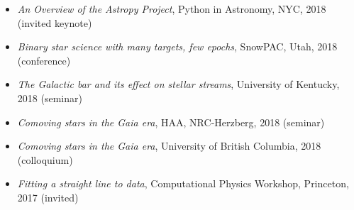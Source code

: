 \documentclass[12pt, letterpaper]{apw-cv}
\begin{document}
\begin{itemize}
    \item \emph{An Overview of the Astropy Project}, Python in Astronomy, NYC, 2018 (invited keynote)
    \item \emph{Binary star science with many targets, few epochs}, SnowPAC, Utah, 2018 (conference)
    \item \emph{The Galactic bar and its effect on stellar streams}, University of Kentucky, 2018 (seminar)
    \item \emph{Comoving stars in the Gaia era}, HAA, NRC-Herzberg, 2018 (seminar)
    \item \emph{Comoving stars in the Gaia era}, University of British Columbia, 2018 (colloquium)
    \item \emph{Fitting a straight line to data}, Computational Physics Workshop, Princeton, 2017 (invited)

\end{itemize}
\end{document}

